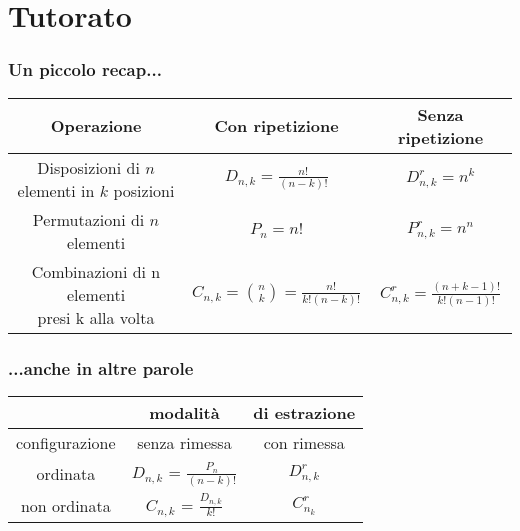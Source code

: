 \documentclass{beamer}
\date[06/04/2022]{6 aprile 2022}
\begin{document}
\frame{\titlepage}

\section{Tutorato}

\begin{frame}[fragile]
	\frametitle{Un piccolo recap...}

	\begin{center}
		\begin{tabular}{|ccc|}
			\hline
			Operazione                   & Con ripetizione & Senza ripetizione \\ \hline
			\makecell{Disposizioni di                                          \\$n$ elementi\\in $k$ posizioni} & $D_{n,k} = \frac{n!}{(n-k)!}$ & $D^r_{n,k} = n^k$ \\
			Permutazioni di $n$ elementi & $P_n = n!$      & $P^r_{n,k} = n^n$ \\
			\makecell{Combinazioni di n elementi                               \\presi k alla volta} & $C_{n,k} = \binom{n}{k} = \frac{n!}{k!(n-k)!}$ & $C^r_{n,k} = \frac{(n+k-1)!}{k!(n-1)!}$ \\ \hline
		\end{tabular}
	\end{center}

\end{frame}

\begin{frame}[fragile]
	\frametitle{...anche in altre parole}

	\begin{center}

		\begin{tabular}{|ccc|}
			\hline
			               & modalità                           & di estrazione \\ \hline
			configurazione & senza rimessa                      & con rimessa   \\ \hline
			ordinata       & $D_{n, k}$ = $\frac{P_n}{(n-k)!}$  & $D^r_{n, k}$  \\
			non ordinata   & $C_{n, k}$ = $\frac{D_{n, k}}{k!}$ & $C^r_{n_k}$   \\ \hline
		\end{tabular}
	\end{center}

\end{frame}
\end{document}
